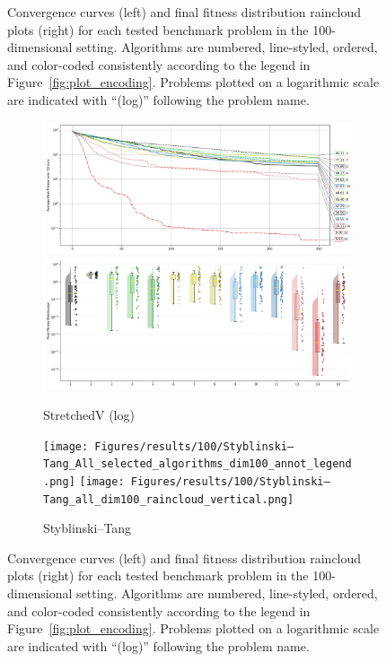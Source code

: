 \begin{figure}[p]
\captionsetup{list=no}
\caption[Convergence curves and final fitness distribution raincloud plots for 100-dimensional problems]{Convergence curves (left) and final fitness distribution raincloud plots (right) for each tested benchmark problem in the 100-dimensional setting. Algorithms are numbered, line-styled, ordered, and color-coded consistently according to the legend in Figure~\ref{fig:plot_encoding}. Problems plotted on a logarithmic scale are indicated with ``(log)'' following the problem name.}
\end{figure}





\begin{figure}[H]\ContinuedFloat
\renewcommand\thesubfigure{C.\arabic{figure}.\arabic{subfigure}} %

    \centering

\begin{subfigure}{1\textwidth}
    \centering
    \includegraphics[width=.49\textwidth]{Figures/results/100/StretchedV_All_selected_algorithms_dim100_annot_legend.png}
    \includegraphics[width=.49\textwidth]{Figures/results/100/StretchedV_all_dim100_raincloud_vertical.png}
    \caption{StretchedV (log)}
\end{subfigure}

\begin{subfigure}{1\textwidth}
    \centering
    \texttt{[image: Figures/results/100/Styblinski–Tang\_All\_selected\_algorithms\_dim100\_annot\_legend.png]}
    \texttt{[image: Figures/results/100/Styblinski–Tang\_all\_dim100\_raincloud\_vertical.png]}
    \caption{Styblinski–Tang}
\end{subfigure}

\caption[Convergence curves and final fitness distribution raincloud plots for\\100-dimensional problems]{Convergence curves (left) and final fitness distribution raincloud plots (right) for each tested benchmark problem in the 100-dimensional setting. Algorithms are numbered, line-styled, ordered, and color-coded consistently according to the legend in Figure~\ref{fig:plot_encoding}. Problems plotted on a logarithmic scale are indicated with ``(log)'' following the problem name.}
\label{fig:results100}
\end{figure}


